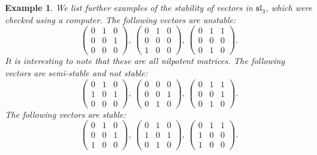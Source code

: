 \documentclass[12pt]{amsart}
\theoremstyle{plain}
\newtheorem{example}[theorem]{Example}
\begin{document}
\begin{example}
We list further examples of the stability of vectors in $\mathfrak{sl}_3$, which were checked using a computer.
The following vectors are unstable:
$$
\begin{pmatrix} 
	0 & 1 & 0 \\ 
	0 & 0 & 1 \\
	0 & 0 & 0 
\end{pmatrix}, \, 
\begin{pmatrix} 
	0 & 1 & 0 \\ 
	0 & 0 & 0 \\
	1 & 0 & 0 
\end{pmatrix}, \, 
\begin{pmatrix} 
	0 & 1 & 1 \\ 
	0 & 0 & 0 \\
	0 & 1 & 0 
\end{pmatrix}.
$$
It is interesting to note that these are all nilpotent matrices.
The following vectors are semi-stable and not stable:
$$
\begin{pmatrix} 
	0 & 1 & 0 \\ 
	1 & 0 & 1 \\
	0 & 0 & 0 
\end{pmatrix}, \, 
\begin{pmatrix} 
	0 & 0 & 0 \\ 
	0 & 0 & 1 \\
	0 & 1 & 0 
\end{pmatrix}, \, 
\begin{pmatrix} 
	0 & 1 & 1 \\ 
	0 & 0 & 1 \\
	0 & 1 & 0 
\end{pmatrix}.
$$
The following vectors are stable:
$$
\begin{pmatrix} 
	0 & 1 & 0 \\ 
	0 & 0 & 1 \\
	1 & 0 & 0 
\end{pmatrix}, \, 
\begin{pmatrix} 
	0 & 1 & 0 \\ 
	1 & 0 & 1 \\
	0 & 1 & 0 
\end{pmatrix}, \, 
\begin{pmatrix} 
	0 & 1 & 1 \\ 
	1 & 0 & 0 \\
	1 & 0 & 0 
\end{pmatrix}.
$$ \\
\end{example}
\end{document}
